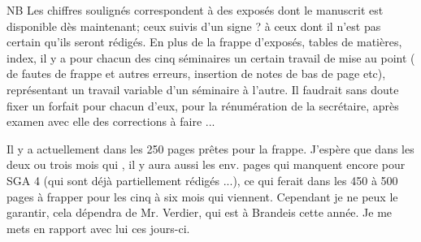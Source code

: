 
NB Les chiffres soulignés correspondent à des exposés dont le manuscrit est disponible dès maintenant; ceux suivis d'un signe ? à ceux dont il n'est pas certain qu'ils seront rédigés. En plus de la frappe d'exposés, tables de matières, index, il y a pour chacun des cinq séminaires  un certain travail de mise au point ( de fautes de frappe et autres erreurs, insertion de notes de bas de page etc), représentant un travail variable d'un séminaire à l'autre. Il faudrait sans doute fixer un forfait pour chacun d'eux, pour la rénumération de la secrétaire, après examen avec elle des corrections à faire ...

Il y a actuellement dans les 250 pages prêtes pour la frappe. J'espère que dans les deux ou trois mois qui , il y aura aussi les env.  pages qui manquent encore pour SGA 4 (qui sont déjà partiellement rédigés ...), ce qui ferait dans les 450 à 500 pages à frapper pour les cinq à six mois qui viennent. Cependant je ne peux le garantir, cela dépendra de Mr. Verdier, qui est à Brandeis cette année. Je me mets en rapport avec lui ces jours-ci.
